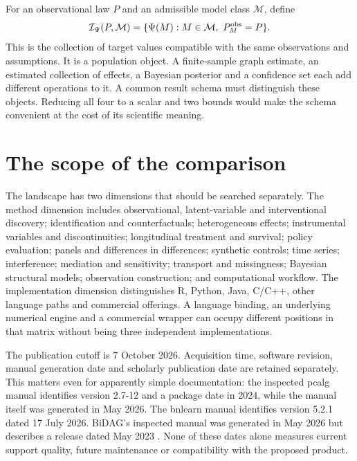 For an observational law $P$ and an admissible model class $\mathcal M$, define
\begin{equation}
 \mathcal I_\Psi(P,\mathcal M)
 =\{\Psi(M):M\in\mathcal M,\ P_M^{\rm obs}=P\}.
 \label{exec13:identified-set}
\end{equation}
This is the collection of target values compatible with the same observations
and assumptions. It is a population object. A finite-sample graph estimate,
an estimated collection of effects, a Bayesian posterior and a confidence set
each add different operations to it. A common result schema must distinguish
these objects. Reducing all four to a scalar and two bounds would make the
schema convenient at the cost of its scientific meaning.

\section{The scope of the comparison}

The landscape has two dimensions that should be searched separately. The
method dimension includes observational, latent-variable and interventional
discovery; identification and counterfactuals; heterogeneous effects;
instrumental variables and discontinuities; longitudinal treatment and survival;
policy evaluation; panels and differences in differences; synthetic controls;
time series; interference; mediation and sensitivity; transport and missingness;
Bayesian structural models; observation construction; and computational
workflow. The implementation dimension distinguishes R, Python, Java,
C/C++, other language paths and commercial offerings. A language binding,
an underlying numerical engine and a commercial wrapper can occupy different
positions in that matrix without being three independent implementations.

The publication cutoff is 7 October 2026. Acquisition time, software revision,
manual generation date and scholarly publication date are retained separately.
This matters even for apparently simple documentation: the inspected pcalg
manual identifies version 2.7-12 and a package date in 2024, while the manual
itself was generated in May 2026. The bnlearn manual identifies version 5.2.1
dated 17 July 2026. BiDAG's inspected manual was generated in May 2026 but
describes a release dated May 2023
\citep{exec13_pcalg,exec13_bnlearn,exec13_bidag}. None of these dates alone
measures current support quality, future maintenance or compatibility with
the proposed product.


